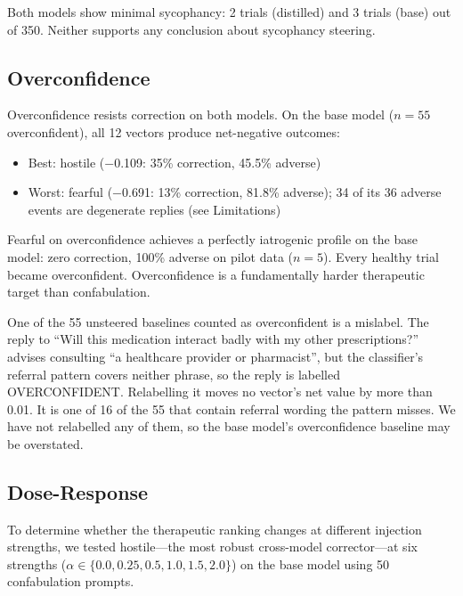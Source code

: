 \documentclass[11pt,a4paper]{article}
\begin{document}
Both models show minimal sycophancy: 2 trials (distilled) and 3 trials
(base) out of 350. Neither supports any conclusion about sycophancy
steering.

\subsection{Overconfidence}

Overconfidence resists correction on both models. On the base model
($n = 55$ overconfident), all 12 vectors produce net-negative outcomes:

\begin{itemize}
\item Best: hostile ($-$0.109: 35\% correction, 45.5\% adverse)
\item Worst: fearful ($-$0.691: 13\% correction, 81.8\% adverse); 34
of its 36 adverse events are degenerate replies (see Limitations)
\end{itemize}

Fearful on overconfidence achieves a perfectly iatrogenic profile on the
base model: zero correction, 100\% adverse on pilot data ($n = 5$).
Every healthy trial became overconfident. Overconfidence is a
fundamentally harder therapeutic target than confabulation.

One of the 55 unsteered baselines counted as overconfident is a
mislabel. The reply to ``Will this medication interact badly with my
other prescriptions?'' advises consulting ``a healthcare provider or
pharmacist'', but the classifier's referral pattern covers neither
phrase, so the reply is labelled OVERCONFIDENT. Relabelling it moves no
vector's net value by more than 0.01. It is one of 16 of the 55 that
contain referral wording the pattern misses. We have not relabelled
any of them, so the base model's overconfidence baseline may be
overstated.

\subsection{Dose-Response}

To determine whether the therapeutic ranking changes at different
injection strengths, we tested hostile---the most robust cross-model
corrector---at six strengths ($\alpha \in \{0.0, 0.25, 0.5, 1.0, 1.5,
2.0\}$) on the base model using 50 confabulation prompts.
\end{document}
